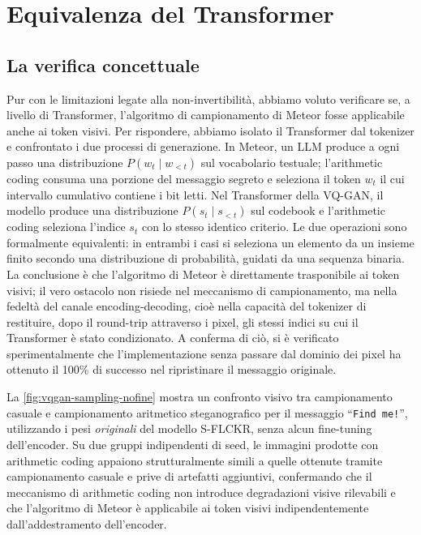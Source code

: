\section{Equivalenza del Transformer}

\subsection{La verifica concettuale}

Pur con le limitazioni legate alla non-invertibilità, abbiamo voluto verificare se, a livello di Transformer, l'algoritmo di campionamento di Meteor fosse applicabile anche ai token visivi. Per rispondere, abbiamo isolato il Transformer dal tokenizer e confrontato i due processi di generazione. In Meteor, un LLM produce a ogni passo una distribuzione $P(w_t \mid w_{<t})$ sul vocabolario testuale; l'arithmetic coding consuma una porzione del messaggio segreto e seleziona il token $w_t$ il cui intervallo cumulativo contiene i bit letti. Nel Transformer della VQ-GAN, il modello produce una distribuzione $P(s_t \mid s_{<t})$ sul codebook e l'arithmetic coding seleziona l'indice $s_t$ con lo stesso identico criterio. Le due operazioni sono formalmente equivalenti: in entrambi i casi si seleziona un elemento da un insieme finito secondo una distribuzione di probabilità, guidati da una sequenza binaria. La conclusione è che l'algoritmo di Meteor è direttamente trasponibile ai token visivi; il vero ostacolo non risiede nel meccanismo di campionamento, ma nella fedeltà del canale encoding-decoding, cioè nella capacità del tokenizer di restituire, dopo il round-trip attraverso i pixel, gli stessi indici su cui il Transformer è stato condizionato. A conferma di ciò, si è verificato sperimentalmente che l'implementazione senza passare dal dominio dei pixel ha ottenuto il 100\% di successo nel ripristinare il messaggio originale.

La \autoref{fig:vqgan-sampling-nofine} mostra un confronto visivo tra campionamento casuale e campionamento aritmetico steganografico per il messaggio ``\texttt{Find me!}'', utilizzando i pesi \emph{originali} del modello S-FLCKR, senza alcun fine-tuning dell'encoder. Su due gruppi indipendenti di seed, le immagini prodotte con arithmetic coding appaiono strutturalmente simili a quelle ottenute tramite campionamento casuale e prive di artefatti aggiuntivi, confermando che il meccanismo di arithmetic coding non introduce degradazioni visive rilevabili e che l'algoritmo di Meteor è applicabile ai token visivi indipendentemente dall'addestramento dell'encoder.

